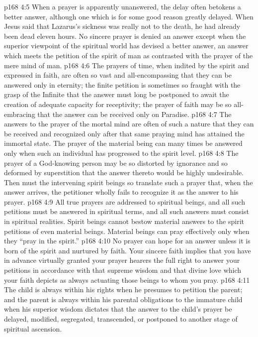 \vs p168 4:5 \bibnobreakspace When a prayer is apparently unanswered, the delay often betokens a better answer, although one which is for some good reason greatly delayed. When Jesus said that Lazarus’s sickness was really not to the death, he had already been dead eleven hours. No sincere prayer is denied an answer except when the superior viewpoint of the spiritual world has devised a better answer, an answer which meets the petition of the spirit of man as contrasted with the prayer of the mere mind of man.
\vs p168 4:6 \bibnobreakspace The prayers of time, when indited by the spirit and expressed in faith, are often so vast and all\hyp{}encompassing that they can be answered only in eternity; the finite petition is sometimes so fraught with the grasp of the Infinite that the answer must long be postponed to await the creation of adequate capacity for receptivity; the prayer of faith may be so all\hyp{}embracing that the answer can be received only on Paradise.
\vs p168 4:7 \bibnobreakspace The answers to the prayer of the mortal mind are often of such a nature that they can be received and recognized only after that same praying mind has attained the immortal state. The prayer of the material being can many times be answered only when such an individual has progressed to the spirit level.
\vs p168 4:8 \bibnobreakspace The prayer of a God\hyp{}knowing person may be so distorted by ignorance and so deformed by superstition that the answer thereto would be highly undesirable. Then must the intervening spirit beings so translate such a prayer that, when the answer arrives, the petitioner wholly fails to recognize it as the answer to his prayer.
\vs p168 4:9 \bibnobreakspace All true prayers are addressed to spiritual beings, and all such petitions must be answered in spiritual terms, and all such answers must consist in spiritual realities. Spirit beings cannot bestow material answers to the spirit petitions of even material beings. Material beings can pray effectively only when they “pray in the spirit.”
\vs p168 4:10 \bibnobreakspace No prayer can hope for an answer unless it is born of the spirit and nurtured by faith. Your sincere faith implies that you have in advance virtually granted your prayer hearers the full right to answer your petitions in accordance with that supreme wisdom and that divine love which your faith depicts as always actuating those beings to whom you pray.
\vs p168 4:11 \bibnobreakspace The child is always within his rights when he presumes to petition the parent; and the parent is always within his parental obligations to the immature child when his superior wisdom dictates that the answer to the child’s prayer be delayed, modified, segregated, transcended, or postponed to another stage of spiritual ascension.
